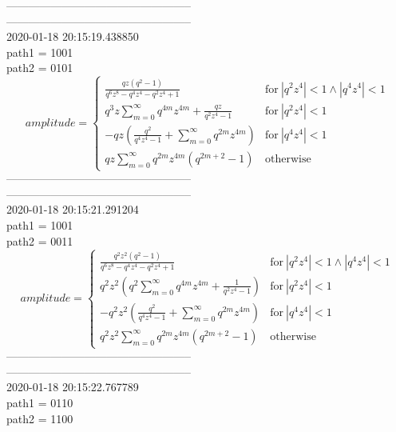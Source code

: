 \documentclass{jsreport}
\begin{document}
--------------------------------------------------\\
--------------------------------------------------\\
2020-01-18 20:15:19.438850\\
path1 = 1001\\
path2 = 0101\\
$$amplitude = \begin{cases} \frac{q z \left(q^{2} - 1\right)}{q^{6} z^{8} - q^{4} z^{4} - q^{2} z^{4} + 1} & \text{for}\: \left|{q^{2} z^{4}}\right| < 1 \wedge \left|{q^{4} z^{4}}\right| < 1 \\q^{3} z \sum_{m=0}^{\infty} q^{4 m} z^{4 m} + \frac{q z}{q^{2} z^{4} - 1} & \text{for}\: \left|{q^{2} z^{4}}\right| < 1 \\- q z \left(\frac{q^{2}}{q^{4} z^{4} - 1} + \sum_{m=0}^{\infty} q^{2 m} z^{4 m}\right) & \text{for}\: \left|{q^{4} z^{4}}\right| < 1 \\q z \sum_{m=0}^{\infty} q^{2 m} z^{4 m} \left(q^{2 m + 2} - 1\right) & \text{otherwise} \end{cases}$$
--------------------------------------------------\\
--------------------------------------------------\\
2020-01-18 20:15:21.291204\\
path1 = 1001\\
path2 = 0011\\
$$amplitude = \begin{cases} \frac{q^{2} z^{2} \left(q^{2} - 1\right)}{q^{6} z^{8} - q^{4} z^{4} - q^{2} z^{4} + 1} & \text{for}\: \left|{q^{2} z^{4}}\right| < 1 \wedge \left|{q^{4} z^{4}}\right| < 1 \\q^{2} z^{2} \left(q^{2} \sum_{m=0}^{\infty} q^{4 m} z^{4 m} + \frac{1}{q^{2} z^{4} - 1}\right) & \text{for}\: \left|{q^{2} z^{4}}\right| < 1 \\- q^{2} z^{2} \left(\frac{q^{2}}{q^{4} z^{4} - 1} + \sum_{m=0}^{\infty} q^{2 m} z^{4 m}\right) & \text{for}\: \left|{q^{4} z^{4}}\right| < 1 \\q^{2} z^{2} \sum_{m=0}^{\infty} q^{2 m} z^{4 m} \left(q^{2 m + 2} - 1\right) & \text{otherwise} \end{cases}$$
--------------------------------------------------\\
--------------------------------------------------\\
2020-01-18 20:15:22.767789\\
path1 = 0110\\
path2 = 1100\\
\end{document}
